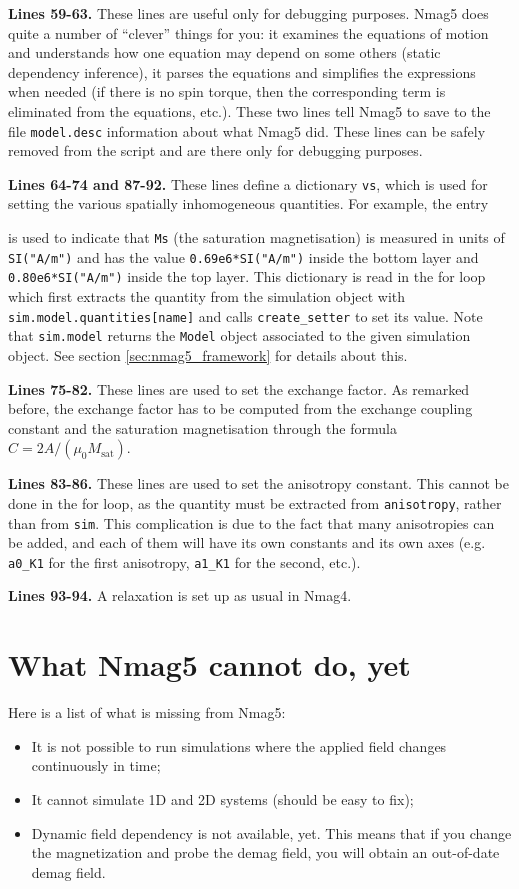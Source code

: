 \documentclass[11pt,oneside,openany]{article}
\newcommand{\Ms}{M_{\mathrm{sat}}}
\begin{document}
\textbf{Lines 59-63.} These lines are useful only for debugging purposes.
Nmag5 does quite a number of ``clever'' things for you: it examines
the equations of motion and understands how one equation may depend on
some others (static dependency inference), it parses the equations
and simplifies the expressions when needed (if there is no spin torque, then
the corresponding term is eliminated from the equations, etc.).
These two lines tell Nmag5 to save to the file \verb|model.desc| information
about what Nmag5 did. These lines can be safely removed from the script
and are there only for debugging purposes.

\textbf{Lines 64-74 and 87-92.} These lines define a dictionary \verb|vs|,
which is used for setting the various spatially inhomogeneous quantities. For
example, the entry

 is used to indicate
that \verb|Ms| (the saturation magnetisation) is measured in units of
\verb|SI("A/m")| and has the value \verb|0.69e6*SI("A/m")| inside the bottom
layer and \verb|0.80e6*SI("A/m")| inside the top layer. This dictionary is
read in the for loop which first extracts the quantity from the
simulation object with \verb|sim.model.quantities[name]| and calls
\verb|create_setter| to set its value. Note that \verb|sim.model| returns
the \verb|Model| object associated to the given simulation object.
See section \ref{sec:nmag5_framework} for details about this.

\textbf{Lines 75-82.} These lines are used to set the exchange factor.
As remarked before, the exchange factor has to be computed from the
exchange coupling constant and the saturation magnetisation through
the formula $C = 2A/(\mu_0 \Ms)$.

\textbf{Lines 83-86.} These lines are used to set the anisotropy constant.
This cannot be done in the for loop, as the quantity must be extracted from
\verb|anisotropy|, rather than from \verb|sim|. This complication is due
to the fact that many anisotropies can be added, and each of them will have
its own constants and its own axes (e.g. \verb|a0_K1| for the first
anisotropy, \verb|a1_K1| for the second, etc.).

\textbf{Lines 93-94.} A relaxation is set up as usual in Nmag4.

\section{What Nmag5 cannot do, yet} \label{sec:missing_from_nmag5}
Here is a list of what is missing from Nmag5:
\begin{itemize}
\item It is not possible to run simulations where the applied field
  changes continuously in time;
\item It cannot simulate 1D and 2D systems (should be easy to fix);
\item Dynamic field dependency is not available, yet. This means that
  if you change the magnetization and probe the demag field, you will
  obtain an out-of-date demag field.
\end{itemize}
\end{document}

